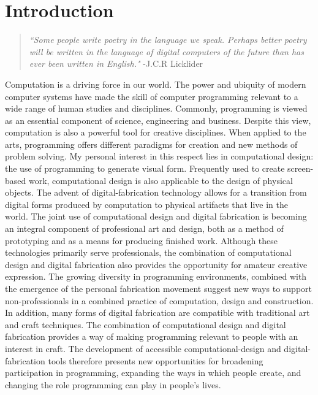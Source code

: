 \chapter{Introduction}
\begin{quotation}

\textit{``Some people write poetry in the language we speak. Perhaps better poetry will be written in the language of digital computers of the future than has ever been written in English."}
-J.C.R Licklider
\end{quotation}


Computation is a driving force in our world. The power and ubiquity of  modern computer systems have made the skill of computer programming relevant to a wide range of human studies and disciplines. Commonly, programming is viewed as an essential component of science, engineering and business. Despite this view, computation is also a powerful tool for creative disciplines. When applied to the arts, programming offers different paradigms for creation and new methods of problem solving. My personal interest in this respect lies in computational design: the use of programming to generate visual form. Frequently used to create screen-based work, computational design is also applicable to the design of physical objects. The advent of digital-fabrication technology allows for a transition from digital forms produced by computation to physical artifacts that live in the world. The joint use of computational design and digital fabrication is becoming an integral component  of professional art and design, both as a method of prototyping and as a means for producing finished work. Although these technologies primarily serve professionals, the combination of computational design and digital fabrication also provides the opportunity for amateur creative expression. The growing diversity in programming environments, combined with the emergence of the personal fabrication movement suggest new ways to support non-professionals in a combined practice of computation, design and construction. In addition, many forms of digital fabrication are compatible with traditional art and craft techniques. The combination of computational design and digital fabrication provides a way of making programming relevant to people with an interest in craft.  The development of accessible computational-design and digital-fabrication tools therefore presents new opportunities for broadening participation in programming, expanding the ways in which people create, and changing the role programming can play in people's lives.

